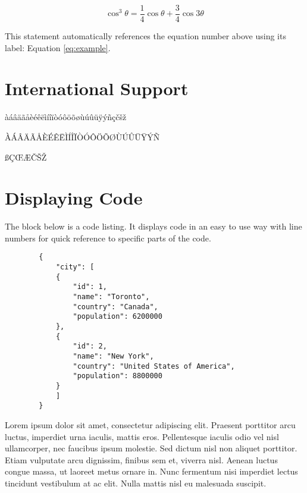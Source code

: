 \documentclass[a4paper]{CSMakotoTechnicalReport}
\begin{document}
\begin{multicols}{2}
    \begin{equation}
        \cos^3 \theta =\frac{1}{4}\cos\theta+\frac{3}{4}\cos 3\theta
        \label{eq:example}
    \end{equation}

    This statement automatically references the equation number above using its label: Equation \ref{eq:example}.


    \section{International Support}

    àáâäãåèéêëìíîïòóôöõøùúûüÿýñçčšž

    ÀÁÂÄÃÅÈÉÊËÌÍÎÏÒÓÔÖÕØÙÚÛÜŸÝÑ

    ßÇŒÆČŠŽ


    \section{Displaying Code}

    The block below is a code listing. It displays code in an easy to use way with line numbers for quick reference to specific parts of the code.

    \begin{lstlisting}
        {
            "city": [
            {
                "id": 1,
                "name": "Toronto",
                "country": "Canada",
                "population": 6200000
            },
            {
                "id": 2,
                "name": "New York",
                "country": "United States of America",
                "population": 8800000
            }
            ]
        }
    \end{lstlisting}

    Lorem ipsum dolor sit amet, consectetur adipiscing elit. Praesent porttitor arcu luctus, imperdiet urna iaculis, mattis eros. Pellentesque iaculis odio vel nisl ullamcorper, nec faucibus ipsum molestie. Sed dictum nisl non aliquet porttitor. Etiam vulputate arcu dignissim, finibus sem et, viverra nisl. Aenean luctus congue massa, ut laoreet metus ornare in. Nunc fermentum nisi imperdiet lectus tincidunt vestibulum at ac elit. Nulla mattis nisl eu malesuada suscipit.


\end{multicols}
\end{document}
